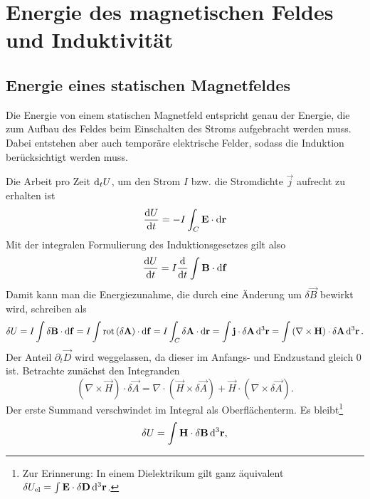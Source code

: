 \section{Energie des magnetischen Feldes und Induktivität}

\subsection{Energie eines statischen Magnetfeldes}

Die Energie von einem statischen Magnetfeld entspricht genau der Energie, die zum Aufbau des Feldes beim Einschalten des Stroms aufgebracht werden muss. Dabei entstehen aber auch temporäre elektrische Felder, sodass die Induktion berücksichtigt werden muss.

Die Arbeit pro Zeit $\diff _{t}U$, um den Strom $I$ bzw. die Stromdichte $\vec {j}$ aufrecht zu erhalten ist
\begin{equation*}
	\frac{\diff U}{\diff t}=-I\int _{C}\vec {E}\cdot \diff \vec {r}
\end{equation*}
Mit der integralen Formulierung des Induktionsgesetzes gilt also
\begin{equation*}
	\frac{\diff U}{\diff t}=I\frac{\diff }{\diff t}\int \vec {B}\cdot \diff \vec {f}
\end{equation*}
Damit kann man die Energiezunahme, die durch eine Änderung um $\delta \vec {B}$ bewirkt wird, schreiben als
\begin{equation*}
	\delta U=I\int \delta \vec {B}\cdot \diff \vec {f}=I\int \rot \left(\delta \vec {A}\right)\cdot \diff \vec {f}=I\int _{C}\delta \vec {A}\cdot \diff \vec {r}=\int \vec {j}\cdot \delta \vec {A}\diffa[3]{\vec{r}}=\int \left(\nabla \times \vec {H}\right)\cdot \delta \vec {A}\diffa[3]{\vec{r}}.
\end{equation*}
Der Anteil $\partial _{t}\vec {D}$ wird weggelassen, da dieser im Anfangs- und Endzustand gleich $0$ ist. Betrachte zunächst den Integranden
\begin{equation*}
	\left(\nabla \times \vec {H}\right)\cdot \delta \vec {A}=\nabla \cdot \left(\vec {H}\times \delta \vec {A}\right)+\vec {H}\cdot \left(\nabla \times \delta \vec {A}\right).
\end{equation*}
Der erste Summand verschwindet im Integral als Oberflächenterm. Es bleibt\footnote{Zur Erinnerung: In einem Dielektrikum gilt ganz äquivalent $\delta U_{\mathrm{el}}=\int \vec {E}\cdot \delta \vec {D}\diffa[3]{\vec{r}}$. }
\begin{equation*}
	\delta U=\int \vec {H}\cdot \delta \vec {B}\diffa[3]{\vec{r}},
\end{equation*}
